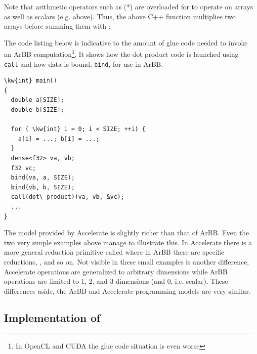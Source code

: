 
Note that arithmetic operators such as (*) are overloaded 
for to operate on arrays as well as scalars (e.g.  above).
Thus, the above C++ function multiplies two arrays before summing them with :

The code listing below is indicative to the amount of glue code needed to invoke an 
ArBB computation\footnote{In OpenCL and CUDA the glue code situation is even worse}. It shows how the dot product code is launched using {\tt call} and 
how data is bound, {\tt bind}, for use in ArBB. 

\vspace{2mm}
\begin{Verbatim}[commandchars=\\\{\}]
\kw{int} main() 
{ 
  double a[SIZE];
  double b[SIZE];

  for ( \kw{int} i = 0; i < SIZE; ++i) { 
    a[i] = ...; b[i] = ...;
  }
  dense<f32> va, vb;
  f32 vc;
  bind(va, a, SIZE); 
  bind(vb, b, SIZE); 
  call(dot\_product)(va, vb, &vc); 
  ...
}
\end{Verbatim}



The model provided by Accelerate is slightly richer than that of ArBB.
Even the two very simple  examples above manage to illustrate 
this. In Accelerate there is a more general reduction primitive called  
where in ArBB there are specific reductions, ,  
and so on. Not visible in these small examples is another difference, Accelerate 
operations are generalized to arbitrary dimensions while ArBB operations are 
limited to 1, 2, and 3 dimensions (and 0, i.e. scalar). These differences aside,
the ArBB and Accelerate programming models are very similar.


\subsection{Implementation of \systemname{}} 


